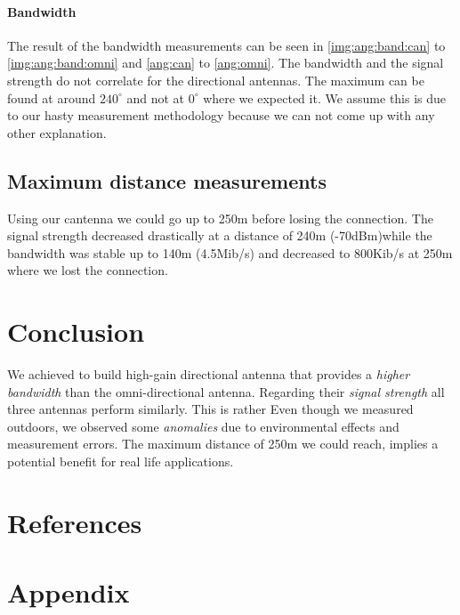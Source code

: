 \documentclass[12pt,a4paper]{article}
\begin{document}
		\paragraph{Bandwidth}
		The result of the bandwidth measurements can be seen in \autoref{img:ang:band:can} to \autoref{img:ang:band:omni} and \autoref{ang:can} to \autoref{ang:omni}.
		The bandwidth and the signal strength do not correlate for the directional antennas. The maximum can be found at around $240^{\circ}$ and not at $0^{\circ}$ where we expected it. We assume this is due to our hasty measurement methodology because we can not come up with any other explanation.
		
		
	\subsection{Maximum distance measurements}\label{max:dist}
		Using our cantenna we could go up to 250m before losing the connection.
		The signal strength decreased drastically at a distance of 240m (-70dBm)while the bandwidth was stable up to 140m (4.5Mib/s) and decreased to 800Kib/s at 250m where we lost the connection.
				

\section{Conclusion}
	We achieved to build high-gain directional antenna that provides a \emph{higher bandwidth} than the omni-directional antenna.
	Regarding their \emph{signal strength} all three antennas perform similarly. This is rather 
	Even though we measured outdoors, we observed some \emph{anomalies} due to environmental effects and measurement errors.
	The maximum distance of 250m we could reach, implies a potential benefit for real life applications.
	
\section{References}




\section{Appendix} \label{appendix}
\pagestyle{empty}



\end{document}
